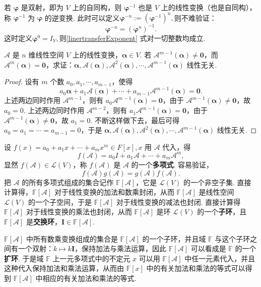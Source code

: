 \documentclass[12pt, a4paper,newtx]{ctexart}
\begin{document}
若 $\bm\varphi$ 是双射，即为 $V$ 上的自同构，则 $\bm\varphi^{-1}$ 也是 $V$ 上的线性变换（也是自同构），称 $\bm\varphi^{-1}$ 为 $\bm\varphi$ 的逆变换. 此时可以定义$\bm\varphi^{-n} := (\bm\varphi^{-1})^n,$则不难验证：
\[
\bm\varphi^{-n} = (\bm\varphi^n)^{-1}.
\]
这时定义$\bm\varphi^0 = I_V,$则\eqref{linertransferExponent} 式对一切整数均成立. 
\begin{proposition}{}{}
	 $\mathcal{A}$ 是 $n$ 维线性空间 $V$ 上的线性变换，$\bm{\alpha} \in V$. 若 $\mathcal{A}^{m-1}(\bm{\alpha}) \neq \bm{0}$，而 $\mathcal{A}^m(\bm{\alpha}) = \bm{0}$，求证：$\bm{\alpha}, \mathcal{A}(\bm{\alpha}), \mathcal{A}^2(\bm{\alpha}), \cdots, \mathcal{A}^{m-1}(\bm{\alpha})$ 线性无关. 
\end{proposition}
\begin{proof}
	设有 $m$ 个数 $a_0, a_1, \cdots, a_{m-1}$，使得
	\[
	a_0\bm{\alpha} + a_1\mathcal{A}(\bm{\alpha}) + \cdots + a_{m-1}\mathcal{A}^{m-1}(\bm{\alpha}) = \bm{0}.
	\]
	上述两边同时作用 $\mathcal{A}^{m-1}$，则有 $a_0\mathcal{A}^{m-1}(\bm{\alpha}) = \bm{0}$，由于 $\mathcal{A}^{m-1}(\bm{\alpha}) \neq \bm{0}$，故 $a_0 = 0$. 上述两边同时作用 $\mathcal{A}^{m-2}$，则有 $a_1\mathcal{A}^{m-1}(\bm{\alpha}) = \bm{0}$，由于 $\mathcal{A}^{m-1}(\bm{\alpha}) \neq \bm{0}$，故 $a_1 = 0$. 不断这样做下去，最后可得 $a_0 = a_1 = \cdots = a_{m-1} = 0$，于是 $\bm{\alpha}, \mathcal{A}(\bm{\alpha}), \mathcal{A}^2(\bm{\alpha}), \cdots, \mathcal{A}^{m-1}(\bm{\alpha})$ 线性无关. 
\end{proof}
设 $f(x) = a_0 + a_1 x + \cdots + a_m x^m \in F[x], x$ 用 $\mathcal{A}$ 代入，得
\[
f(\mathcal{A}) = a_0 I + a_1 \mathcal{A} + \cdots + a_m \mathcal{A}^m, 
\]
显然 $f(\mathcal{A}) \in \mathcal{L}(V)$，称 $f(\mathcal{A})$ 是 $\mathcal{A}$ 的一个\textbf{多项式}. 容易验证，
\[
f(\mathcal{A}) g(\mathcal{A}) = g(\mathcal{A}) f(\mathcal{A}).
\]
把 $\mathcal{A}$ 的所有多项式组成的集合记作 $\mathbb F[\mathcal{A}]$，它是 $\mathcal{L}(V)$ 的一个非空子集. 直接计算得，$\mathbb F[\mathcal{A}]$ 对于线性变换的加法和数乘封闭，从而 $\mathbb F[\mathcal{A}]$ 是线性空间 $\mathcal{L}(V)$ 的一个子空间，于是 $\mathbb F[\mathcal{A}]$ 对于线性变换的减法也封闭. 直接计算得 $\mathbb F[\mathcal{A}]$ 对于线性变换的乘法也封闭，从而 $\mathbb F[\mathcal{A}]$ 是环 $\mathcal{L}(V)$ 的一个\textbf{子环}，且 $\mathbb F[\mathcal{A}]$ 是\textbf{交换环}，$\bm{I} \in \mathbb F[\mathcal{A}]$.

$\mathbb F[\mathcal{A}]$ 中所有数乘变换组成的集合是 $\mathbb F[\mathcal{A}]$ 的一个子环，并且域 $\mathbb F$ 与这个子环之间有一个双射：$k \longmapsto k\bm{I}$，保持加法与乘法运算，因此 $\mathbb F[\mathcal{A}]$ 可以看成是 $\mathbb F$ 的一个\textbf{扩环}. 于是域 $\mathbb F$ 上一元多项式中的不定元 $x$ 可以用 $\mathbb F[\mathcal{A}]$ 中任一元素代入，并且这种代入保持加法和乘法运算，从而由 $\mathbb F[x]$ 中的有关加法和乘法的等式可以得到 $\mathbb F[\mathcal{A}]$ 中相应的有关加法和乘法的等式. 
\end{document}
